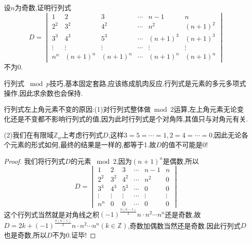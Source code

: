 \documentclass[../../main.tex]{subfiles}%
\begin{document}
\begin{example}
设\( n \)为奇数,证明行列式
\[
D = \begin{vmatrix}
1 & 2 & 3 & \cdots & n-1 & n \\
2^2 & 3^2 & 4^2 & \cdots & n^2 & (n+1)^2 \\
3^3 & 4^3 & 5^3 & \cdots & (n+1)^3 & (n+1)^3 \\
\vdots & \vdots & \vdots & \cdots & \vdots & \vdots \\
n^n & (n+1)^n & (n+1)^n & \cdots & (n+1)^n & (n+1)^n
\end{vmatrix}
\]
不为0.
\end{example}
\begin{note}
行列式 \(\bmod p\)技巧,基本固定套路,应该练成肌肉反应.行列式是元素的多元多项式操作,因此求余数也会保持.
\end{note}
\begin{remark}
行列式左上角元素不变的原因:(1)对行列式整体做$\bmod 2$运算,左上角元素无论变化还是不变都不影响行列式的值,因为此时行列式是个对角阵,其值只与对角元有关.

(2)我们在有限域\( \mathbb{Z}_w \)上考虑行列式\( D \),这样$3=5=\cdots =1,2=4=\cdots =0$,因此无论各个元素的形式如何,最终的结果是一样的,都等于1.故$D$的值不可能是0!
\end{remark}
\begin{proof}
我们将行列式\( D \)的元素 \(\bmod 2\),因为\( (n+1)^n \)是偶数,所以
\[
D = \begin{vmatrix}
1 & 2 & 3 & \cdots & n-1 & n \\
2^2 & 3^2 & 4^2 & \cdots & n^2 & 0 \\
3^3 & 4^3 & 5^3 & \cdots & 0 & 0 \\
\vdots & \vdots & \vdots & \cdots & \vdots & \vdots \\
n^n & 0 & 0 & \cdots & 0 & 0
\end{vmatrix}
\]
这个行列式当然就是对角线之积\(\left( -1 \right) ^{\frac{n\left( n-1 \right)}{2}}n\cdot n^2\cdots n^n\)还是奇数,故$D=2k+\left( -1 \right) ^{\frac{n\left( n-1 \right)}{2}}n\cdot n^2\cdots n^n(k\in \mathbb{Z})$,奇数加偶数当然还是奇数.因此行列式\( D \)也是奇数,所以\( D \)不为0.证毕!
\end{proof}
\end{document}
